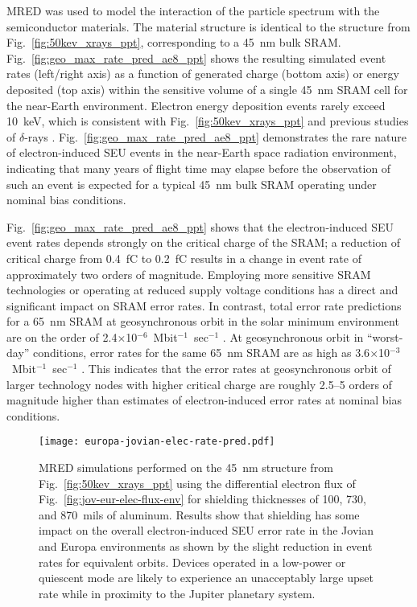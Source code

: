 MRED was used to model the interaction of the particle spectrum with the semiconductor materials. 
The material structure is identical to the structure from Fig.~\ref{fig:50kev_xrays_ppt}, corresponding to a 45~nm bulk SRAM.
Fig.~\ref{fig:geo_max_rate_pred_ae8_ppt} shows the resulting simulated event rates (left/right axis) as a function of generated charge (bottom axis) or energy deposited (top axis) within the sensitive volume of a single 45~nm SRAM cell for the near-Earth environment. 
Electron energy deposition events rarely exceed 10~keV, which is consistent with Fig.~\ref{fig:50kev_xrays_ppt} and previous studies of $\delta$-rays \cite{King:2010cu, King:2012cb}. 
Fig.~\ref{fig:geo_max_rate_pred_ae8_ppt} demonstrates the rare nature of electron-induced SEU events in the near-Earth space radiation environment, indicating that many years of flight time may elapse before the observation of such an event is expected for a typical 45~nm bulk SRAM operating under nominal bias conditions.  

Fig.~\ref{fig:geo_max_rate_pred_ae8_ppt} shows that the electron-induced SEU event rates depends strongly on the critical charge of the SRAM; a reduction of critical charge from 0.4~fC to 0.2~fC results in a change in event rate of approximately two orders of magnitude. 
Employing more sensitive SRAM technologies or operating at reduced supply voltage conditions has a direct and significant impact on SRAM error rates. 
In contrast, total error rate predictions for a 65~nm SRAM at geosynchronous orbit in the solar minimum environment are on the order of 2.4$\times$10$^{-6}$~Mbit$^{-1}$~sec$^{-1}$ \cite{Sierawski:2009ka}.
At geosynchronous orbit in ``worst-day'' conditions, error rates for the same 65~nm SRAM are as high as 3.6$\times$10$^{-3}$~Mbit$^{-1}$~sec$^{-1}$ \cite{Sierawski:2009ka}.
This indicates that the error rates at geosynchronous orbit of larger technology nodes with higher critical charge are roughly 2.5--5 orders of magnitude higher than estimates of electron-induced error rates at nominal bias conditions.

\begin{figure}[htbp]
    \begin{center}
        \texttt{[image: europa-jovian-elec-rate-pred.pdf]}
    \end{center}
    \caption{MRED simulations performed on the 45~nm structure from Fig.~\ref{fig:50kev_xrays_ppt} using the differential electron flux of Fig.~\ref{fig:jov-eur-elec-flux-env} for shielding thicknesses of 100, 730, and 870~mils of aluminum. 
    Results show that shielding has some impact on the overall electron-induced SEU error rate in the Jovian and Europa environments as shown by the slight reduction in event rates for equivalent orbits.
    Devices operated in a low-power or quiescent mode are likely to experience an unacceptably large upset rate while in proximity to the Jupiter planetary system.}
    \label{fig:europa-jovian-elec-rate-pred}
\end{figure}

